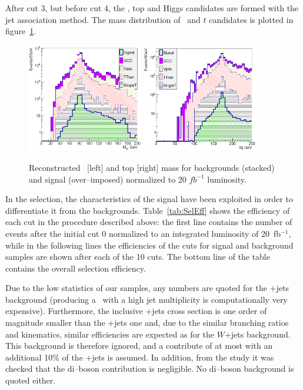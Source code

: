 After cut 3, but before cut 4, the \W, top and Higgs candidates are formed with the jet association method. The mass distribution of \W~and $t$ candidates is plotted in figure~\ref{fig:MWMTop}.

\begin{figure}[!Hhtbp]
  \begin{center}
    \includegraphics[width=0.45\textwidth]{figs/Pheno/MW.png}
    \includegraphics[width=0.45\textwidth]{figs/Pheno/Mtop.png}
    \caption{Reconstructed \W~[left] and top [right] mass for backgrounds (stacked) and signal (over--imposed) normalized to 20 $fb^{-1}$ luminosity.}
    \label{fig:MWMTop}
  \end{center}
\end{figure}

In the selection, the characteristics of the signal have been exploited in order to differentiate it from the backgrounds. Table~\ref{tab:SelEff} shows the efficiency of each cut in the procedure described above: the first line contains the number of events after the initial cut 0 normalized to an integrated luminosity of 20~fb$^{-1}$, while in the following lines the efficiencies of the cuts for signal and background samples are shown after each of the 10 cuts. The bottom line of the table contains the overall selection efficiency. 

Due to the low statistics of our samples, any numbers are quoted for the \Z+jets background (producing a \Z~with a high jet multiplicity is computationally very expensive). Furthermore, the inclusive \Z+jets cross section is one order of magnitude smaller than the \W+jets one and, due to the similar branching ratios and kinematics, similar efficiencies are expected as for the $W$+jets background. This background is therefore ignored, and a contribute of at most with an additional 10\% of the \W+jets is assumed. In addition, from the study it was checked that the di--boson contribution is negligible. No di--boson background is quoted either.

